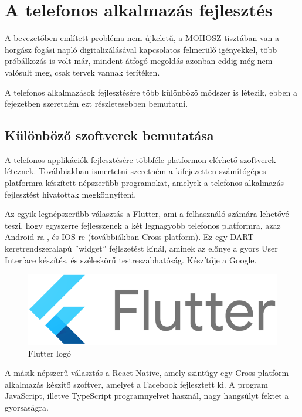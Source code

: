 \chapter{A telefonos alkalmazás fejlesztés}

A bevezetőben említett probléma nem újkeletű, a MOHOSZ tisztában van a horgász fogási napló digitalizálásával
kapcsolatos felmerülő igényekkel, több próbálkozás is volt már, mindent átfogó megoldás azonban eddig még nem valósult meg, csak tervek vannak terítéken\cite{Mohosz}.

A telefonos alkalmazások fejlesztésére több különböző módszer is létezik, ebben a fejezetben szeretném
ezt részletesebben bemutatni.

\section{Különböző szoftverek bemutatása}

A telefonos applikációk fejlesztésére többféle platformon elérhető szoftverek léteznek.
Továbbiakban ismertetni szeretném a kifejezetten számítógépes platformra készített népszerűbb programokat,
amelyek a telefonos alkalmazás fejlesztést hivatottak megkönnyíteni.
\vspace{.5cm}

Az egyik legnépszerűbb választás a Flutter, ami a felhasználó számára lehetővé teszi, hogy egyszerre
fejlesszenek a két legnagyobb telefonos platformra, azaz Android-ra , és IOS-re (továbbiákban Cross-platform).
Ez egy DART keretrendszeralapú ˝widget˝ fejlszetést kínál, aminek az előnye a gyors User Interface készítés,
és széleskörű testreszabhatóság\cite{Flutter}. Készítője a Google.

\begin{figure}[h]
\centering
\includegraphics[scale=0.2]{images/flutter.png}
\caption{Flutter logó}
\label{fig:flutter}
\end{figure}

A másik népszerű választás a React Native\cite{React}, amely szintúgy egy Cross-platform alkalmazás készítő szoftver,
amelyet a Facebook fejlesztett ki. A program JavaScript, illetve TypeScript programnyelvet használ,
nagy hangsúlyt fektet a gyorsaságra.

